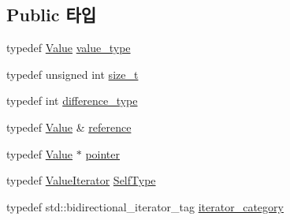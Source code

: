 \subsection*{Public 타입}
\begin{DoxyCompactItemize}
\item 
typedef \hyperlink{class_json_1_1_value}{Value} \hyperlink{class_json_1_1_value_iterator_a2c5ba7be611f05546530c8a88b2d2e37}{value\+\_\+type}
\item 
typedef unsigned int \hyperlink{class_json_1_1_value_iterator_a308b8932ffc83eaa9d12dadd5c11a7dd}{size\+\_\+t}
\item 
typedef int \hyperlink{class_json_1_1_value_iterator_a2be1a9aa60bbfc8812e9dd1a7f1a8786}{difference\+\_\+type}
\item 
typedef \hyperlink{class_json_1_1_value}{Value} \& \hyperlink{class_json_1_1_value_iterator_ae87929b4567aa00372cf602c43b57160}{reference}
\item 
typedef \hyperlink{class_json_1_1_value}{Value} $\ast$ \hyperlink{class_json_1_1_value_iterator_acec45feb1ef1f3bf81240157d06d5432}{pointer}
\item 
typedef \hyperlink{class_json_1_1_value_iterator}{Value\+Iterator} \hyperlink{class_json_1_1_value_iterator_a23357670fdad61792670d86f62db7e16}{Self\+Type}
\item 
typedef std\+::bidirectional\+\_\+iterator\+\_\+tag \hyperlink{class_json_1_1_value_iterator_base_a02fd11a4fbdc0007da1e8bcf5e6b83c3}{iterator\+\_\+category}
\end{DoxyCompactItemize}
